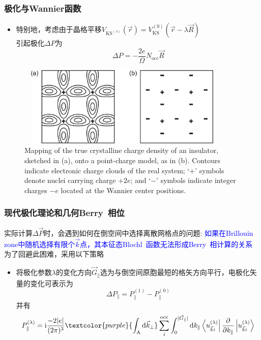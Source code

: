 \frame
{
	\frametitle{极化与\textrm{Wannier}函数}
	\begin{itemize}
		\item 特别地，考虑由于晶格平移$V_{\mathrm{KS}^{(\lambda)}}(\vec r)=V_{\mathrm{KS}}^{(0)}(\vec r-\lambda\vec R)$\\
			引起极化$\Delta P$为
			\begin{displaymath}
				\Delta P=-\frac{2e}{\Omega}N_{\mathrm{occ}}\vec R
			\end{displaymath}
	\end{itemize}
\begin{figure}[h!]
\centering
\vspace*{-0.12in}
\includegraphics[height=1.5in,width=4.0in,viewport=0 0 1500 640,clip]{Figures/Mapping-of-the-true-crystalline-charge-density-of-an-insulator.png}
\caption{\tiny \textrm{Mapping of the true crystalline charge density of an insulator, sketched in (a), onto a point-charge model, as in (b). Contours indicate electronic charge clouds of the real system; ‘$+$’ symbols denote nuclei carrying charge $+2e$; and ‘$−$’ symbols indicate integer charges $−e$ located at the Wannier center positions.}}%
\label{Polizarized-Berry_Wannier}
\end{figure} 
}

\frame
{
	\frametitle{现代极化理论和几何\textrm{Berry~}相位}
	实际计算$\Delta\vec P$时，会遇到如何在倒空间中选择离散网格点的问题:
	\vskip 5pt
	\textcolor{blue}{如果在\textrm{Brillouin zone}中随机选择有限个$\vec k$点，其本征态\textrm{Blochl~}函数无法形成\textrm{Berry~}相计算的关系} 
	\vskip 5pt
	为了回避此困难，采用以下策略
	\begin{itemize}
		\item 将极化参数$\lambda$的变化方向$\vec G_{\lVert}$选为与倒空间原胞最短的格矢方向平行，电极化矢量的变化可表示为
			\begin{displaymath}
				\Delta P_{\lVert}=P_{\lVert}^{(1)}-P_{\lVert}^{(0)}
			\end{displaymath}
			并有
			\begin{displaymath}
				P_{\lVert}^{(\lambda)}=\mathrm{i}\frac{-2|e|}{(2\pi)^3}\textcolor{purple}{\int_{\mathrm{A}}\mathrm{d}\vec k_{\bot}}\sum_i^{\mathrm{occ}}\int_0^{|\vec G_{\lVert}|}\mathrm{d}k_{\lVert}\left\langle u_{\vec k i}^{(\lambda)}\right|\frac{\partial}{\partial k_{\lVert}}\left|u_{\vec k i}^{(\lambda)}\right\rangle
			\end{displaymath}

	\end{itemize}
}


